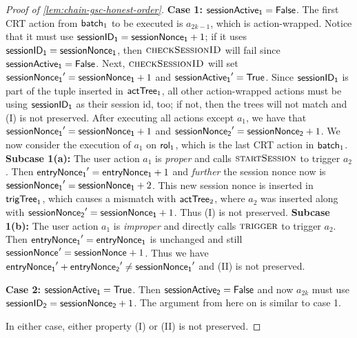 \begin{proof}[Proof of \cref{lem:chain-gsc-honest-order}]
    \noindent\textbf{Case 1:} $\mathsf{sessionActive_{1}} = \mathsf{False}$. The first CRT action from $\mathsf{batch}_{1}$ to be executed is $a_{2k-1}$, which is action-wrapped. Notice that it must use $\mathsf{sessionID_{1}} = \mathsf{sessionNonce_{1}} + 1$; if it uses $\mathsf{sessionID_{1}} = \mathsf{sessionNonce_{1}}$, then $\textproc{checkSessionID}$ will fail since $\mathsf{sessionActive_{1}} = \mathsf{False}$. Next, $\textproc{checkSessionID}$ will set $\mathsf{sessionNonce_{1}}' = \mathsf{sessionNonce_{1}} + 1$ and $\mathsf{sessionActive_{1}}' = \mathsf{True}$. Since $\mathsf{sessionID_{1}}$ is part of the tuple inserted in $\mathsf{actTree}_1$, all other action-wrapped actions must be using $\mathsf{sessionID_{1}}$ as their session id, too; if not, then the trees will not match and (I) is not preserved. After executing all actions except $a_1$, we have that $\mathsf{sessionNonce_{1}}' = \mathsf{sessionNonce_{1}} + 1$ and $\mathsf{sessionNonce_{2}}' = \mathsf{sessionNonce_{2}} + 1$. We now consider the execution of $a_1$ on $\mathsf{rol}_{1}$, which is the last CRT action in $\mathsf{batch}_{1}$.
    \noindent\textbf{Subcase 1(a):} The user action $a_1$ is \emph{proper} and calls $\textproc{startSession}$ to trigger $a_2$. Then $\mathsf{entryNonce_{1}}' = \mathsf{entryNonce_{1}} + 1$ and \emph{further} the session nonce now is $\mathsf{sessionNonce_{1}}' = \mathsf{sessionNonce_{1}} + 2$. This new session nonce is inserted in $\mathsf{trigTree}_1$, which causes a mismatch with $\mathsf{actTree}_2$, where $a_2$ was inserted along with $\mathsf{sessionNonce_{2}}' = \mathsf{sessionNonce_{1}} + 1$. Thus (I) is not preserved.
    \noindent\textbf{Subcase 1(b):} The user action $a_1$ is \emph{improper} and directly calls $\textproc{trigger}$ to trigger $a_2$. Then $\mathsf{entryNonce_{1}}' = \mathsf{entryNonce_{1}}$ is unchanged and still $\mathsf{sessionNonce_{}}' = \mathsf{sessionNonce_{}} + 1$. Thus we have $\mathsf{entryNonce_{1}}' + \mathsf{entryNonce_{2}}' \neq \mathsf{sessionNonce_{1}}' $ and (II) is not preserved.
    
    \noindent\textbf{Case 2:} $\mathsf{sessionActive_{1}} = \mathsf{True}$. Then $\mathsf{sessionActive_{2}} = \mathsf{False}$ and now $a_{2k}$ must use $\mathsf{sessionID_{2}} = \mathsf{sessionNonce_{2}} + 1$. The argument from here on is similar to case 1.

    In either case, either property (I) or (II) is not preserved.
\end{proof}
